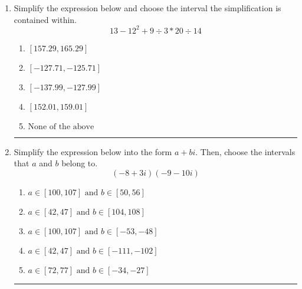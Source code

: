 \documentclass[14pt]{extbook}
\newcommand{\litem}[1]{\item#1\hspace*{-1cm}\rule{\textwidth}{0.4pt}}
\begin{document}
\begin{enumerate}
{\begin{enumerate}[label=\Alph*.]
\end{enumerate} }
\litem{
Simplify the expression below and choose the interval the simplification is contained within.\[ 13 - 12^2 + 9 \div 3 * 20 \div 14 \]\begin{enumerate}[label=\Alph*.]
\item \( [157.29, 165.29] \)
\item \( [-127.71, -125.71] \)
\item \( [-137.99, -127.99] \)
\item \( [152.01, 159.01] \)
\item \( \text{None of the above} \)

\end{enumerate} }
\litem{
Simplify the expression below into the form $a+bi$. Then, choose the intervals that $a$ and $b$ belong to.\[ (-8 + 3 i)(-9 - 10 i) \]\begin{enumerate}[label=\Alph*.]
\item \( a \in [100, 107] \text{ and } b \in [50, 56] \)
\item \( a \in [42, 47] \text{ and } b \in [104, 108] \)
\item \( a \in [100, 107] \text{ and } b \in [-53, -48] \)
\item \( a \in [42, 47] \text{ and } b \in [-111, -102] \)
\item \( a \in [72, 77] \text{ and } b \in [-34, -27] \)

\end{enumerate} }
\end{enumerate}
\end{document}
